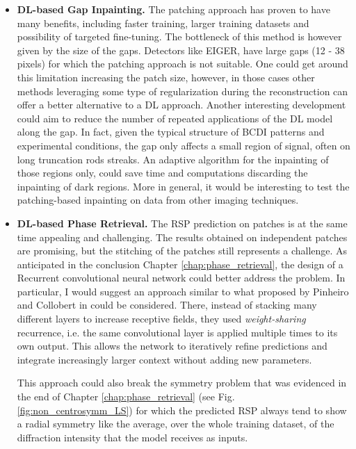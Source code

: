 \begin{itemize}
    \item \textbf{DL-based Gap Inpainting.} The patching approach has proven to have many benefits, including faster training, 
    larger training datasets and possibility of targeted fine-tuning. The bottleneck of this method is however given by 
    the size of the gaps. Detectors like EIGER, have large gaps (12 - 38 pixels) for which the patching approach is not 
    suitable. One could get around this limitation increasing the patch size, however, in those cases other methods 
    leveraging some type of regularization during the reconstruction \cite{Chushkin2025} can offer a better alternative 
    to a DL approach. 
    Another interesting development could aim to reduce the number of repeated applications of the DL model along the gap. 
    In fact, given the typical structure of BCDI patterns and experimental conditions, the gap only affects a small region 
    of signal, often on long truncation rods streaks. An adaptive algorithm for the inpainting of those regions only, could 
    save time and computations discarding the inpainting of dark regions.
    More in general, it would be interesting to test the patching-based inpainting on data from other imaging techniques.   
    
    \item \textbf{DL-based Phase Retrieval.} The RSP prediction on patches is at the same time appealing and challenging. 
    The results obtained on independent patches are promising, but the stitching of the patches still represents a 
    challenge. As anticipated in the conclusion Chapter \ref{chap:phase_retrieval}, the design of a Recurrent convolutional 
    neural network could better address the problem. In particular, I would suggest an approach similar to what proposed 
    by Pinheiro and Collobert in \cite{Pinheiro2014RecurrentCN} could be considered. 
    There, instead of stacking many different layers to increase receptive fields, they used \textit{weight-sharing} recurrence, 
    i.e. the same convolutional layer is applied multiple times to its own output. This allows the network to iteratively 
    refine predictions and integrate increasingly larger context without adding new parameters.
    
    This approach could also break the symmetry problem that was evidenced in the end of Chapter \ref{chap:phase_retrieval}
    (see Fig. \ref{fig:non_centrosymm_LS}) 
    for which the predicted RSP always tend to show a radial symmetry like the average, over the whole training dataset, 
    of the diffraction intensity that the model receives as inputs. 


\end{itemize}
